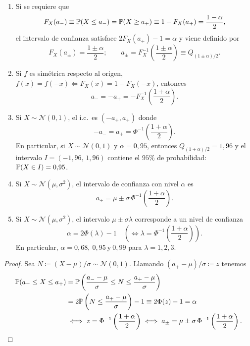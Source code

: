 \begin{proposicion} \, 
\begin{enumerate}
  \item Si se requiere que
  \[
    F_X(a_-) \equiv \mathbb{P}(X \le a_-) = \mathbb{P}(X \ge a_+) \equiv 1 - F_X(a_+) = \frac{1-\alpha}{2},
  \]
  el intervalo de confianza satisface $2F_X(a_+) - 1 = \alpha$ y viene definido por
  \[
    F_X(a_\pm) = \frac{1 \pm \alpha}{2}; \qquad a_\pm = F_X^{-1}\left(\frac{1 \pm \alpha}{2}\right) \equiv Q_{(1\pm\alpha)/2}.
  \]
  \item Si $f$ es simétrica respecto al origen, $f(x) = f(-x) \iff F_X(x) = 1 - F_X(-x)$, entonces
  \[
    a_- = -a_+ = -F_X^{-1}\left(\frac{1+\alpha}{2}\right).
  \]
  \item Si $X \sim \mathcal{N}(0,1)$, el i.c.\ es $(-a_+, a_+)$ donde
  \[
    -a_- = a_+ = \Phi^{-1}\left(\frac{1+\alpha}{2}\right).
  \]
  En particular, si $X \sim \mathcal{N}(0,1)$ y $\alpha = 0{,}95$, entonces $Q_{(1+\alpha)/2} = 1{,}96$ y el intervalo $I = (-1{,}96,\, 1{,}96)$ contiene el $95\%$ de probabilidad: $\mathbb{P}(X \in I) = 0{,}95$.
  \item Si $X \sim \mathcal{N}(\mu, \sigma^2)$, el intervalo de confianza con nivel $\alpha$ es
  \[
    a_\pm = \mu \pm \sigma\,\Phi^{-1}\left(\frac{1+\alpha}{2}\right).
  \]
  \item Si $X \sim \mathcal{N}(\mu, \sigma^2)$, el intervalo $\mu \pm \sigma\lambda$ corresponde a un nivel de confianza
  \[
    \alpha = 2\Phi(\lambda) - 1 \quad \left(\iff \lambda = \Phi^{-1}\left(\frac{1+\alpha}{2}\right)\right).
  \]
  En particular, $\alpha = 0{,}68,\ 0{,}95\ \text{y}\ 0{,}99$ para $\lambda = 1, 2, 3$.
\end{enumerate}
\end{proposicion}

\begin{proof}
Sea $N \coloneqq (X - \mu)/\sigma \sim \mathcal{N}(0,1)$. Llamando $(a_+ - \mu)/\sigma \coloneqq z$ tenemos
\begin{align*}
  \mathbb{P}(a_- \le X \le a_+) &= \mathbb{P}\left(\frac{a_- - \mu}{\sigma} \le N \le \frac{a_+ - \mu}{\sigma}\right) \\
  &= 2\mathbb{P}\left(N \le \frac{a_+ - \mu}{\sigma}\right) - 1 \equiv 2\Phi(z) - 1 = \alpha \\
  &\iff z = \Phi^{-1}\left(\frac{1+\alpha}{2}\right) \iff a_\pm = \mu \pm \sigma\,\Phi^{-1}\left(\frac{1+\alpha}{2}\right). \qedhere
\end{align*}
\end{proof}

